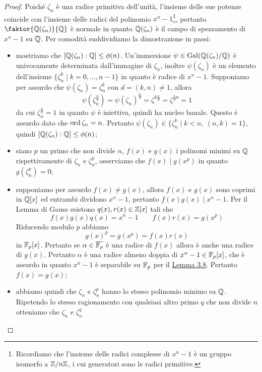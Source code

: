 \documentclass[11pt]{scrartcl}
\begin{document}
	\begin{proof}
		Poiché $\zeta_n$ è una radice primitiva dell'unità, l'insieme delle sue 
		potenze coincide con l'insieme delle radici del polinomio $x^n - 1$\footnote{
			Ricordiamo che l'insieme delle radici complesse di $x^n -1$ è un gruppo 
			isomorfo a ${\mathbb Z}/n{\mathbb Z}$, i cui generatori sono le radici primitive.
		},
		pertanto $\faktor{\QQ(\zeta_n)}{\QQ}$ è normale in quanto $\mathbb Q(\zeta_n)$
		è il campo di spezzamento di $x^n - 1$ su $\mathbb Q$. Per comodità suddividiamo 
		la dimostrazione in passi:
		\begin{itemize}
			\item mostriamo che $[\mathbb Q(\zeta_n):\mathbb Q] \leq \phi(n)$. Un'immersione
			$\psi \in \operatorname{Gal}(\mathbb Q(\zeta_n)/\mathbb Q)$ è univocamente determinata dall'immagine
			di $\zeta_n$, inoltre $\psi(\zeta_n)$ è un elemento dell'insieme 
			$\{\zeta_n^k\mid k = 0, \ldots, n - 1\}$ in quanto è radice di $x^n - 1$.
			Supponiamo per assurdo che $\psi(\zeta_n) = \zeta_n^k$ con $d = (k, n)\neq 1$, 
			allora
			\[
			\psi(\zeta_n^{\frac n d}) = \psi(\zeta_n)^{\frac n d} = \zeta^{k\frac n d} = 
			\zeta^{\frac k d n} = 1
			\]
			da cui $\zeta_n^{\frac n d} = 1$ in quanto $\psi$ è iniettiva, quindi ha 
			nucleo banale. Questo è assurdo dato che $\operatorname{ord} \zeta_n = n$.
			Pertanto $\psi(\zeta_n) \in \{\zeta_n^k\mid k < n,~(n, k) = 1\}$, quindi
			$[\QQ(\zeta_n):\nolinebreak\QQ] \leq \phi(n)$;
			\item siano $p$ un primo che non divide $n$, $f(x)$ e $g(x)$ i polinomi 
			minimi su $\mathbb Q$ rispettivamente di $\zeta_n$ e $\zeta_n^p$, osserviamo
			che $f(x) \mid g(x^p)$ in quanto $g(\zeta_n^p) = 0$;
			\item supponiamo per assurdo $f(x) \neq g(x)$, allora $f(x)$ e $g(x)$
			sono coprimi in $\mathbb Q[x]$ ed entrambi dividono $x^n - 1$, pertanto $f(x)g(x) \mid x^n -1$.
			Per il Lemma di Gauss esistono $q(x), r(x) \in \mathbb Z[x]$ tali che 
			\[
			f(x)g(x)q(x) = x^n - 1\qquad f(x)r(x) = g(x^p)
			\]
			Riducendo modulo $p$ abbiamo 
			\[
			g(x)^p = g(x^p) = f(x)r(x)
			\]
			in $\mathbb F_p[x]$. Pertanto se $\alpha \in \overline{\mathbb F_p}$ è una radice di $f(x)$
			allora è anche una radice di $g(x)$. Pertanto $\alpha$ è una radice
			almeno doppia di $x^n - 1 \in \mathbb F_p[x]$, che è assurdo in quanto $x^n -1$
			è separabile su $\mathbb F_p$ per il \hyperref[lemma3.8]{Lemma 3.8}. Pertanto 
			$f(x) = g(x)$;
			\item abbiamo quindi che $\zeta_n$ e $\zeta_n^p$ hanno lo stesso polinomio 
			minimo su $\mathbb Q$. Ripetendo lo stesso ragionamento con qualsiasi altro 
			primo $q$ che non divide $n$ otteniamo che $\zeta_n$ e $\zeta_n^q$ 

\end{itemize}
\end{proof}
\end{document}
